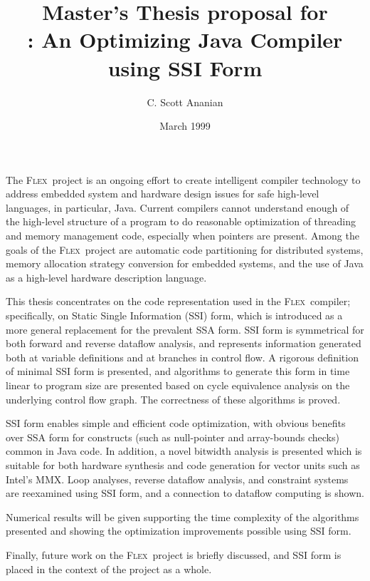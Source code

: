 \documentclass[12pt,notitlepage,twocolumn,twoside]{article}
\title{{\large Master's Thesis proposal for}\\
\magic: An Optimizing Java Compiler using SSI Form}
\author{C. Scott Ananian}
\date{March 1999\\\vspace{5pt}}
\newcommand{\magic}{\textsc{Flex}}
\begin{document}
\pagestyle{myheadings}

\maketitle

The \magic\ project is an ongoing effort to create intelligent
compiler technology to address embedded system and hardware design
issues for safe high-level languages, in particular, Java.
Current compilers cannot understand enough of the high-level structure
of a program to do reasonable optimization of threading and memory
management code, especially when pointers are present. Among the goals
of the \magic\ project are automatic code partitioning for distributed
systems, memory allocation strategy conversion for embedded systems,
and the use of Java as a high-level hardware description language.

This thesis concentrates on the code representation used in the
\magic\ compiler; specifically, on Static Single Information (SSI)
form, which is introduced as a more general replacement for the
prevalent SSA form.  SSI form is symmetrical for both forward and
reverse dataflow analysis, and represents information generated both
at variable definitions and at branches in control flow.  A rigorous
definition of minimal SSI form is presented, and algorithms to
generate this form in time linear to program size are
presented based on cycle equivalence analysis on the underlying
control flow graph.  The correctness of these algorithms is proved.

SSI form enables simple and efficient code optimization, with obvious
benefits over SSA form for constructs (such as null-pointer and
array-bounds checks) common in Java code.  In addition, a novel
bitwidth analysis is presented which is suitable for both hardware
synthesis and code generation for vector units such as Intel's MMX.
Loop analyses, reverse dataflow analysis, and constraint systems are
reexamined using SSI form, and a connection to dataflow computing is
shown.

Numerical results will be given supporting the time complexity of the
algorithms presented and showing the optimization improvements
possible using SSI form.

Finally, future work on the \magic\ project is briefly discussed, and
SSI form is placed in the context of the project as a whole.
\end{document}
